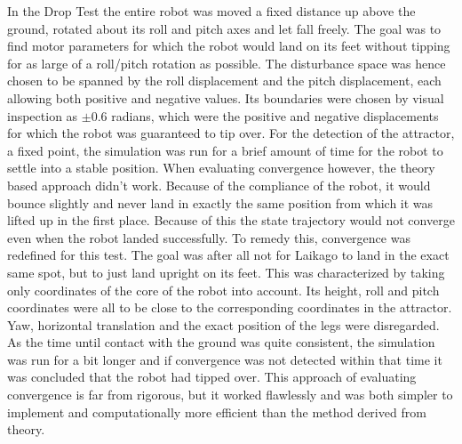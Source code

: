     In the Drop Test the entire robot was moved a fixed distance up above the ground, rotated about its roll and pitch axes and let fall freely. The goal was to find motor parameters for which the robot would land on its feet without tipping for as large of a roll/pitch rotation as possible. The disturbance space was hence chosen to be spanned by the roll displacement and the pitch displacement, each allowing both positive and negative values. Its boundaries were chosen by visual inspection as $\pm 0.6$ radians, which were the positive and negative displacements for which the robot was guaranteed to tip over. For the detection of the attractor, a fixed point, the simulation was run for a brief amount of time for the robot to settle into a stable position. When evaluating convergence however, the theory based approach didn't work. Because of the compliance of the robot, it would bounce slightly and never land in exactly the same position from which it was lifted up in the first place. Because of this the state trajectory would not converge even when the robot landed successfully. To remedy this, convergence was redefined for this test. The goal was after all not for Laikago to land in the exact same spot, but to just land upright on its feet. This was characterized by taking only coordinates of the core of the robot into account. Its height, roll and pitch coordinates were all to be close to the corresponding coordinates in the attractor. Yaw, horizontal translation and the exact position of the legs were disregarded.
    As the time until contact with the ground was quite consistent, the simulation was run for a bit longer and if convergence was not detected within that time it was concluded that the robot had tipped over. This approach of evaluating convergence is far from rigorous, but it worked flawlessly and was both simpler to implement and computationally more efficient than the method derived from theory. 


